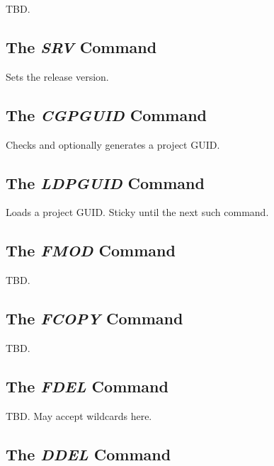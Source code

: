 \documentclass[letterpaper,10pt,titlepage]{article}
\begin{document}
TBD.


\subsection{The \emph{SRV} Command}
\label{scff0:ssrv0}

Sets the release version.


\subsection{The \emph{CGPGUID} Command}
\label{scff0:cgp0}

Checks and optionally generates a project GUID.


\subsection{The \emph{LDPGUID} Command}
\label{scff0:lgp0}

Loads a project GUID.  Sticky until the next such command.


\subsection{The \emph{FMOD} Command}
\label{scff0:sfmd0}

TBD.

\subsection{The \emph{FCOPY} Command}
\label{scff0:sfcp0}

TBD.

\subsection{The \emph{FDEL} Command}
\label{scff0:sfde0}

TBD.  May accept wildcards here.


\subsection{The \emph{DDEL} Command}
\label{scff0:sdde0}
\end{document}
